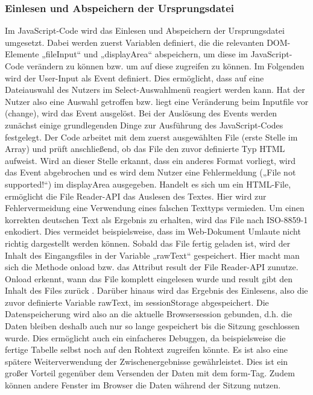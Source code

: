 \subsubsection{Einlesen und Abspeichern der Ursprungsdatei}
Im JavaScript-Code wird das Einlesen und Abspeichern der Ursprungsdatei umgesetzt. Dabei werden zuerst Variablen definiert, die die relevanten DOM-Elemente „fileInput“ und „displayArea“ abspeichern, um diese im JavaScript-Code verändern zu können bzw. um auf diese zugreifen zu können. 
Im Folgenden wird der User-Input als Event definiert. Dies ermöglicht, dass auf eine Dateiauswahl des Nutzers im Select-Auswahlmenü reagiert werden kann. Hat der Nutzer also eine Auswahl getroffen bzw. liegt eine Veränderung beim Inputfile vor (change), wird das Event ausgelöst. Bei der Auslösung des Events werden zunächst einige grundlegenden Dinge zur Ausführung des JavaScript-Codes festgelegt. 
Der Code arbeitet mit dem zuerst ausgewählten File (erste Stelle im Array) und prüft anschließend, ob das File den zuvor definierte Typ HTML aufweist. Wird an dieser Stelle erkannt, dass ein anderes Format vorliegt, wird das Event abgebrochen und es wird dem Nutzer eine Fehlermeldung („File not supported!“) im displayArea ausgegeben. 
Handelt es sich um ein HTML-File, ermöglicht die File Reader-\ac{API} das Auslesen des Textes. Hier wird zur Fehlervermeidung eine Verwendung eines falschen Texttyps vermieden. Um einen korrekten deutschen Text als Ergebnis zu erhalten, wird das File nach ISO-8859-1 enkodiert. Dies vermeidet beispielsweise, dass im Web-Dokument Umlaute nicht richtig dargestellt werden können. Sobald das File fertig geladen ist, wird der Inhalt des Eingangsfiles in der Variable „rawText“ gespeichert. Hier macht man sich die Methode onload bzw. das Attribut result der File Reader-API zunutze. Onload erkennt, wann das File komplett eingelesen wurde und result gibt den Inhalt des Files zurück \cite{fileapi}. Darüber hinaus wird das Ergebnis des Einlesens, also die zuvor definierte Variable rawText, im sessionStorage abgespeichert. Die Datenspeicherung wird also an die aktuelle Browsersession gebunden, d.h. die Daten bleiben deshalb auch nur so lange gespeichert bis die Sitzung geschlossen wurde. Dies ermöglicht auch ein einfacheres Debuggen, da beispielsweise die fertige Tabelle selbst noch auf den Rohtext zugreifen könnte. Es ist also eine spätere Weiterverwendung der Zwischenergebnisse gewährleistet. Dies ist ein großer Vorteil gegenüber dem Versenden der Daten mit dem form-Tag. Zudem können andere Fenster im Browser die Daten während der Sitzung nutzen. 

